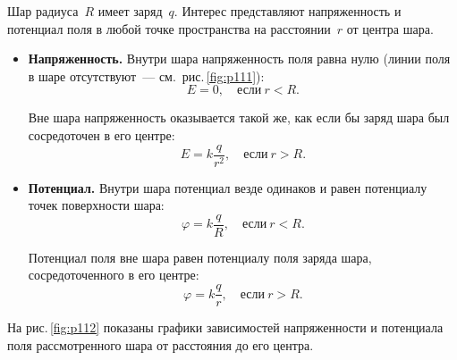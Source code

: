 \documentclass[main.tex]{subfiles}
\begin{document}
Шар радиуса~$R$ имеет заряд~$q$. Интерес представляют напряженность и потенциал поля в любой точке пространства на расстоянии~$r$ от центра шара. 
\begin{itemize}
    \item \textbf{Напряженность.} Внутри шара напряженность поля равна нулю (линии поля в шаре отсутствуют~--- см.~рис.\,\ref{fig:p111}):
    \begin{equation}
    \label{e32}
    E=0,\quad \text{если}\ r<R.
    \end{equation}

    Вне шара напряженность оказывается такой же, как если бы заряд шара был сосредоточен в его центре:
    \begin{equation}
    \label{e33}
    E=k\frac{q}{r^2},\quad \text{если}\ r>R.
    \end{equation}

    \item \textbf{Потенциал.} Внутри шара потенциал везде одинаков и равен потенциалу точек поверхности шара:
    \begin{equation}
    \label{e34}
        \varphi=k\frac{q}{R},\quad \text{если}\ r<R.
    \end{equation}

    Потенциал поля вне шара равен потенциалу поля заряда шара, сосредоточенного в его центре:
    \begin{equation}
    \label{e35}
        \varphi=k\frac{q}{r},\quad \text{если}\ r>R.
    \end{equation}
    
\end{itemize}

На рис.\,\ref{fig:p112} показаны графики зависимостей напряженности и потенциала поля рассмотренного шара от расстояния до его центра.  
\end{document}
